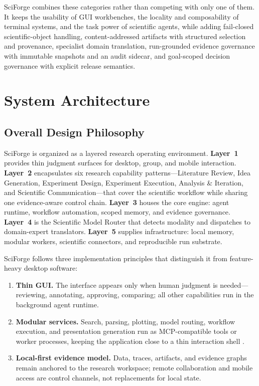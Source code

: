 \documentclass[sn-basic,Numbered,pdflatex]{sn-jnl}
\begin{document}
SciForge combines these categories rather than competing with only one of them. It keeps the usability of GUI workbenches, the locality and composability of terminal systems, and the task power of scientific agents, while adding fail-closed scientific-object handling, content-addressed artifacts with structured selection and provenance, specialist domain translation, run-grounded evidence governance with immutable snapshots and an audit sidecar, and goal-scoped decision governance with explicit release semantics.

\section{System Architecture}\label{sec:system-architecture}

\subsection{Overall Design Philosophy}

SciForge is organized as a layered research operating environment. \textbf{Layer~1} provides thin judgment surfaces for desktop, group, and mobile interaction. \textbf{Layer~2} encapsulates six research capability patterns---Literature Review, Idea Generation, Experiment Design, Experiment Execution, Analysis \& Iteration, and Scientific Communication---that cover the scientific workflow while sharing one evidence-aware control chain. \textbf{Layer~3} houses the core engine: agent runtime, workflow automation, scoped memory, and evidence governance. \textbf{Layer~4} is the Scientific Model Router that detects modality and dispatches to domain-expert translators. \textbf{Layer~5} supplies infrastructure: local memory, modular workers, scientific connectors, and reproducible run substrate.

SciForge follows three implementation principles that distinguish it from feature-heavy desktop software:

\begin{enumerate}
    \item \textbf{Thin GUI.} The interface appears only when human judgment is needed---reviewing, annotating, approving, comparing; all other capabilities run in the background agent runtime.
    \item \textbf{Modular services.} Search, parsing, plotting, model routing, workflow execution, and presentation generation run as MCP-compatible tools or worker processes, keeping the application close to a thin interaction shell \cite{anthropicMCP2024}.
    \item \textbf{Local-first evidence model.} Data, traces, artifacts, and evidence graphs remain anchored to the research workspace; remote collaboration and mobile access are control channels, not replacements for local state.
\end{enumerate}
\end{document}
